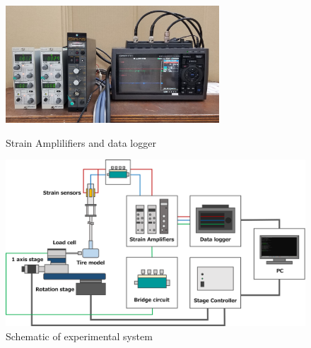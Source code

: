 \begin{figure}[htbp]
    \footnotesize
    \begin{center}
        \includegraphics[width=80mm]{images/22-5.png}
        \caption{Strain Amplilifiers and data logger}
        \includegraphics[width=140mm]{images/22-6.png}
        \caption{Schematic of experimental system}
    \end{center}
\end{figure}